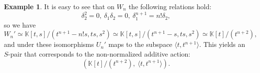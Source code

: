 \documentclass[a4paper,draft,reqno,12pt]{amsart}
\theoremstyle{definition}
\theoremstyle{definition}
\newtheorem{example}{Example}
\theoremstyle{remark}
\def\BK{{\mathbb K}}
\def\BK{{\mathbb K}}
\begin{document}
\begin{example}
    It is easy to see that on $W_n$ the following relations hold:\begin{equation*}
        \delta_2^2=0, \ \delta_1\delta_2=0, \ \delta_1^{n+1} = n!\delta_2,
    \end{equation*} so we have \begin{equation}
        W_n' \simeq \BK[t,s]/(t^{n+1}-n!s, ts, s^2)\simeq\BK[t,s]/(t^{n+1}-s,ts,s^2)\simeq{\BK[t]/(t^{n+2})},
    \end{equation} and under these isomorphisms $U_n'$ maps to the subspace $\langle t, t^{n+1}\rangle$. This yields an $S$-pair that corresponds to the non-normalized additive action:\begin{equation}
        (\BK[t]/(t^{n+2}), \ \langle t, t^{n+1}\rangle).
    \end{equation}
\end{example}
\end{document}
